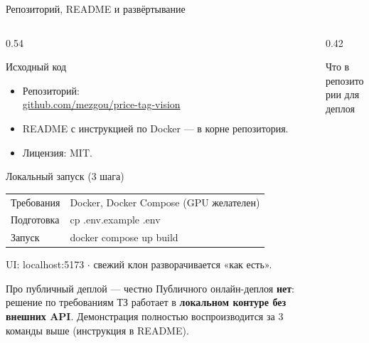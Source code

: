 \documentclass[aspectratio=169,10pt]{beamer}
\newcommand{\code}[1]{{\ttfamily\small\color{slate}#1}}
\newcommand{\dashdash}{\symbol{"2D}\symbol{"2D}}
\newcommand{\hl}[1]{{\bfseries\color{accent}#1}}
\newcommand{\hr}[1]{{\bfseries\color{redtag}#1}}
\begin{document}
\begin{frame}{Репозиторий, README и развёртывание}
  \begin{columns}[T,onlytextwidth]
    \begin{column}{0.54\textwidth}
      \begin{block}{Исходный код}\footnotesize
        \begin{itemize}\setlength\itemsep{2pt}
          \item Репозиторий:\\[0.15em]
            \href{https://github.com/mezgou/price-tag-vision}{\code{github.com/mezgou/price-tag-vision}}
          \item README с инструкцией по Docker — в корне репозитория.
          \item Лицензия: \code{MIT}.
        \end{itemize}
      \end{block}
      \vspace{0.4em}
      \begin{block}{Локальный запуск (3 шага)}\footnotesize
        \setlength{\tabcolsep}{4pt}\renewcommand{\arraystretch}{1.2}
        \begin{tabular}{@{}p{2.2cm}p{5.8cm}@{}}
          Требования  & Docker, Docker Compose (GPU желателен)\\
          Подготовка  & \code{cp .env.example .env}\\
          Запуск      & \code{docker compose up \dashdash build}\\
        \end{tabular}
        \vspace{0.2em}
        {\scriptsize\color{slate} UI: \code{localhost:5173} $\cdot$ свежий клон разворачивается «как есть».}
      \end{block}
      \vspace{0.35em}
      \begin{block}{Про публичный деплой — честно}\footnotesize
        Публичного онлайн-деплоя \hr{нет}: решение по требованиям ТЗ
        работает в \hl{локальном контуре без внешних API}. Демонстрация
        полностью воспроизводится за 3 команды выше (инструкция в README).
      \end{block}
    \end{column}
    \begin{column}{0.42\textwidth}
      \begin{block}{Что в репозитории для деплоя}\footnotesize

\end{block}
\end{column}
\end{columns}
\end{frame}
\end{document}
